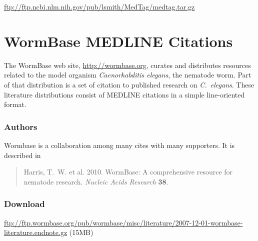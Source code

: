 \url{ftp://ftp.ncbi.nlm.nih.gov/pub/lsmith/MedTag/medtag.tar.gz}




\section{WormBase MEDLINE Citations}\label{section:corpora-wormbase}

The WormBase web site, \url{http://wormbase.org}, curates and distributes
resources related to the model organism {\it Caenorhabditis elegans},
the nematode worm.  Part of that distribution is a set of citation to
published research on {\it C.~elegans}.  These literature
distributions consist of MEDLINE citations in a simple line-oriented
format.

\subsubsection{Authors}

Wormbase is a collaboration among many cites with many supporters.
It is described in 
%
\begin{quote}
Harris, T.~W. et al. 2010. WormBase: A comprehensive resource for
nematode research. {\it Nucleic Acids Research} {\bf 38}.
\end{quote}

\subsubsection{Download}

\url{ftp://ftp.wormbase.org/pub/wormbase/misc/literature/2007-12-01-wormbase-literature.endnote.gz} (15MB)


